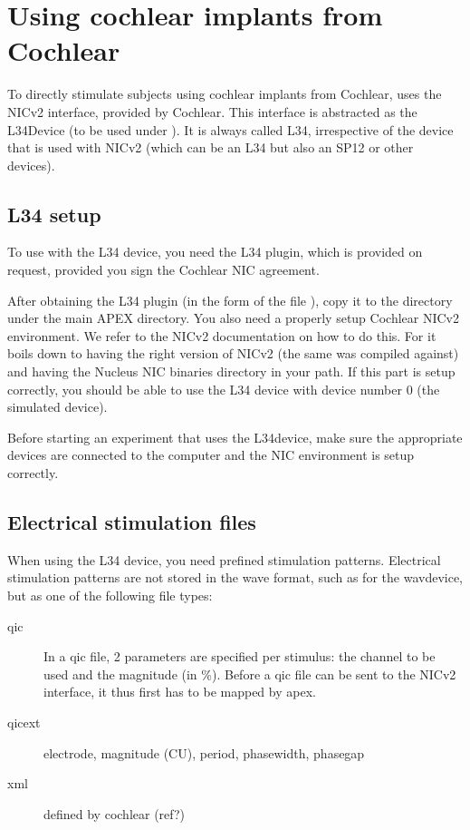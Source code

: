 \chapter{Using cochlear implants from Cochlear}
\label{sec:L34}

To directly stimulate subjects using cochlear implants from Cochlear, \apex uses the NICv2 interface, provided by Cochlear. 
This interface is abstracted as the L34Device (to be used under ). 
It is always called L34, irrespective of the device that is used 
with NICv2 (which can be an L34 but also an SP12 or other devices).

\section{L34 setup}

To use \apex with the L34 device, you need the L34 plugin, which is provided on request, provided you sign the Cochlear NIC agreement.

After obtaining the L34 plugin (in the form of the file ), copy it to the  directory under the main APEX directory.
You also need a properly setup Cochlear NICv2 environment. We refer to the NICv2
documentation on how to do this. For \apex it boils down to having
the right version of NICv2 (the same \apex was compiled against)
and having the Nucleus NIC binaries directory in your path. If
this part is setup correctly, you should be able to use the L34
device with device number 0 (the simulated device).

Before starting an \apex experiment that uses the L34device, make sure the appropriate devices are connected to the computer and the NIC environment is setup correctly. 


\section{Electrical stimulation files}

When using the L34 device, you need prefined stimulation patterns.
Electrical stimulation patterns are not stored in the wave format, such as for the wavdevice, but as one of the following file types:

\begin{description}
\item[qic] In a qic file, 2 parameters are specified per stimulus:
the channel to be used and the magnitude (in \%). Before a qic
file can be sent to the NICv2 interface, it thus first has to be
mapped by apex. 
\item[qicext] electrode, magnitude (CU), period, phasewidth, phasegap
\item[xml] defined by cochlear (ref?)
\end{description}

